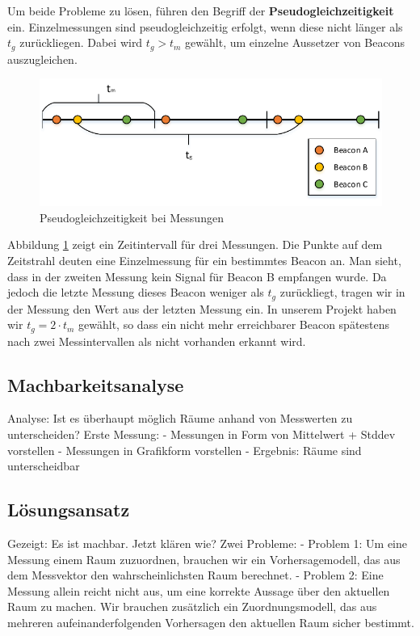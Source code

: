 Um beide Probleme zu lösen, führen den Begriff der \textbf{Pseudogleichzeitigkeit} ein.
Einzelmessungen sind pseudogleichzeitig erfolgt, wenn diese nicht länger als 
$t_g$ zurückliegen. Dabei wird $t_g > t_m$ gewählt, um einzelne Aussetzer von Beacons
auszugleichen.

\begin{figure}[tbh]
\centering
\includegraphics[width=1.0\linewidth]{Bilder/Lok-Messung}
\caption{Pseudogleichzeitigkeit bei Messungen}
\label{fig:Lok-Messung}
\end{figure}

Abbildung \ref{fig:Lok-Messung} zeigt ein Zeitintervall für drei Messungen. Die
Punkte auf dem Zeitstrahl deuten eine Einzelmessung für ein bestimmtes Beacon
an.
Man sieht, dass in der zweiten Messung kein Signal für Beacon B empfangen wurde.
Da jedoch die letzte Messung dieses Beacon weniger als $t_g$ zurückliegt, tragen
wir in der Messung den Wert aus der letzten Messung ein.
In unserem Projekt haben wir $t_g = 2 \cdot t_m$ gewählt, so dass ein nicht mehr
erreichbarer Beacon spätestens nach zwei Messintervallen als nicht vorhanden
erkannt wird.

\subsection{Machbarkeitsanalyse}

Analyse: Ist es überhaupt möglich Räume anhand von Messwerten zu unterscheiden?
Erste Messung:
- Messungen in Form von Mittelwert + Stddev vorstellen
- Messungen in Grafikform vorstellen
- Ergebnis: Räume sind unterscheidbar

\subsection{Lösungsansatz}

Gezeigt: Es ist machbar. Jetzt klären wie?
Zwei Probleme:
- Problem 1: Um eine Messung einem Raum zuzuordnen, brauchen wir ein Vorhersagemodell,
  das aus dem Messvektor den wahrscheinlichsten Raum berechnet.
- Problem 2: Eine Messung allein reicht nicht aus, um eine korrekte Aussage über
  den aktuellen Raum zu machen. Wir brauchen zusätzlich ein Zuordnungsmodell,
  das aus mehreren aufeinanderfolgenden Vorhersagen den aktuellen Raum sicher
  bestimmt.
  
